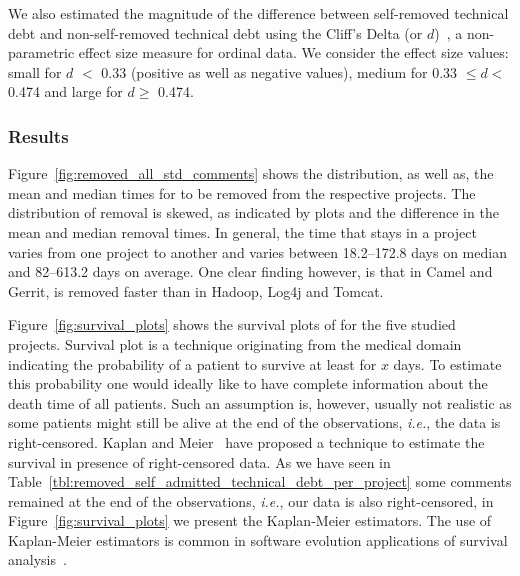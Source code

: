 


We also estimated the magnitude of the difference between self-removed technical debt and non-self-removed technical debt using the Cliff's Delta (or $d$)~\cite{grissom2005effect}, a non-parametric effect size measure for ordinal data. We consider the effect size values: small for $d$ $<$ 0.33 (positive as well as negative values), medium for 0.33  $\leq d<$ 0.474 and large for $d \geq$ 0.474.

\subsubsection*{Results} Figure~\ref{fig:removed_all_std_comments} shows the distribution, as well as, the mean and median times for \SATD to be removed from the respective projects. The distribution of \SATD removal is skewed, as indicated by plots and the difference in the mean and median removal times. In general, the time that \SATD stays in a project  varies from one project to another and varies between 18.2--172.8 days on median and 82--613.2 days on average. One clear finding however, is that in Camel and Gerrit, \SATD is removed faster than in Hadoop, Log4j and Tomcat.

Figure~\ref{fig:survival_plots} shows the survival plots of \SATD for the five studied projects. Survival plot is a technique originating from the medical domain indicating the probability of a patient to survive at least for $x$ days. To estimate this probability one would ideally like to 
have complete information about the death time of all patients. Such an assumption is, however,
usually not realistic as some patients might still be alive at the end of the observations, \emph{i.e.},
the data is right-censored. Kaplan
and Meier~\cite{kaplan1958nonparametric} have proposed a technique to estimate the survival
in presence of right-censored data. As we have seen in Table~\ref{tbl:removed_self_admitted_technical_debt_per_project} some \SATD comments remained at
the end of the observations, \emph{i.e.}, our data is also right-censored, in Figure~\ref{fig:survival_plots}
we present the Kaplan-Meier estimators. The use of Kaplan-Meier estimators is common in 
software evolution applications of survival analysis~\cite{samoladas2010survival,goeminne2015towards}.

